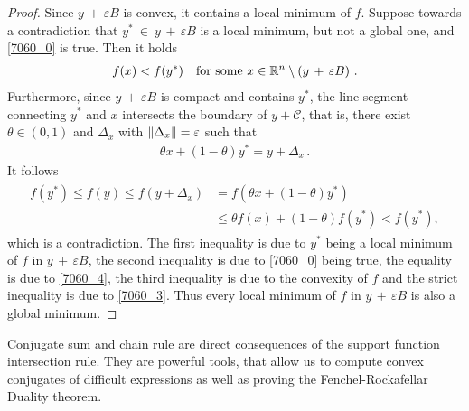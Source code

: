 \begin{proof}
  Since 
  $
  y
  \,
  +
  \,
  \varepsilon
  B
  $
  is convex, it contains a 
  local minimum  
  of $f$.
  Suppose towards a contradiction that
  $
    y^* 
    \ 
    \in 
    \ 
  y
  \,
  +
  \,
  \varepsilon
  B
  $
  is a local minimum, but not a global one, and
  \eqref{7060_0} is true.
  Then it holds
  \begin{gather}
    \label{7060_3}
    f(x) < f(y^*)
    \quad
    \text{for some}\ 
    x 
    \in 
    \R^n 
    \setminus 
    \left( 
  y
  \,
  +
  \,
  \varepsilon
  B
    \right)
  \,.
  \end{gather}
  Furthermore, since 
  $
  y
  \,
  +
  \,
  \varepsilon
  B
  $ is compact and contains $y^*$,
  the line segment connecting 
  $y^*$ and $x$
  intersects the boundary of 
  $y + \mathcal{C}$, that is,
  there exist
  $
    \theta \in (0,1)
  $
  and 
  $
    \Delta_x
  $
  with 
  $
    \left\lVert\Delta_x\right\rVert=\varepsilon
  $
  such that
  \begin{gather}
    \label{7060_4}
    \theta x + (1 - \theta) y^* = y + \Delta_x
    \,.
  \end{gather}
    It follows
    \begin{align}
      \label{7060_5}
      \begin{split}
      f(y^*)
      \le
      f(y)
      \le
      f(y + \Delta_x)
      &=
      f(
        \theta x + (1 - \theta) y^*
      )
      \\
      &\le
      \theta f(x)
      + 
      (1 - \theta)
      f(y^*)
      <
      f(y^*)
      ,
      \end{split}
    \end{align}
    which is a contradiction.
    The first inequality is due to
    $y^*$ being a local minimum of $f$ in
    $
  y
  \,
  +
  \,
  \varepsilon
  B
    $,
    the second inequality is due to  
    \eqref{7060_0} being true,
    the equality is due to \eqref{7060_4},
    the third inequality is due to the convexity of $f$
    and the strict inequality is due to \eqref{7060_3}.
    Thus every local minimum of $f$ in
    $
  y
  \,
  +
  \,
  \varepsilon
  B
    $
    is also a global minimum.
\end{proof}


\begin{takeaways}
  Conjugate sum and chain rule are direct consequences of the support function intersection rule. They are powerful tools, that allow us to compute convex conjugates of difficult expressions as well as proving the Fenchel-Rockafellar Duality theorem.
\end{takeaways}
